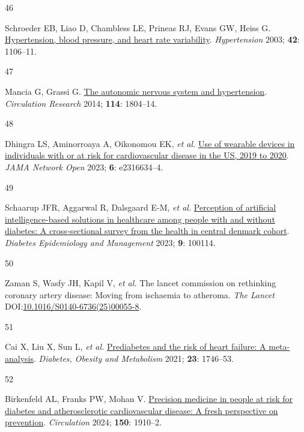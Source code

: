 \documentclass[
  a4paper,
  headsepline=true,
  open=any]{scrbook}
\newlength{\cslhangindent}
\newlength{\csllabelwidth}
\newlength{\cslentryspacingunit} %
\newenvironment{CSLReferences}[2] %
 {%
  \setlength{\parindent}{0pt}
  \ifodd #1
  \let\oldpar\par
  \def\par{\hangindent=\cslhangindent\oldpar}
  \fi
  \setlength{\parskip}{#2\cslentryspacingunit}
 }%
 {}
\newcommand{\CSLLeftMargin}[1]{\parbox[t]{\csllabelwidth}{#1}}
\newcommand{\CSLRightInline}[1]{\parbox[t]{\linewidth - \csllabelwidth}{#1}\break}
\begin{document}
\begin{CSLReferences}{0}{0}
\leavevmode{}%
\CSLLeftMargin{46 }%
\CSLRightInline{Schroeder EB, Liao D, Chambless LE, Prineas RJ, Evans
GW, Heiss G.
\href{https://doi.org/doi:10.1161/01.HYP.0000100444.71069.73}{Hypertension,
blood pressure, and heart rate variability}. \emph{Hypertension} 2003;
\textbf{42}: 1106--11.}

\leavevmode{}%
\CSLLeftMargin{47 }%
\CSLRightInline{Mancia G, Grassi G.
\href{https://doi.org/10.1161/CIRCRESAHA.114.302524}{The autonomic
nervous system and hypertension}. \emph{Circulation Research} 2014;
\textbf{114}: 1804--14.}

\leavevmode{}%
\CSLLeftMargin{48 }%
\CSLRightInline{Dhingra LS, Aminorroaya A, Oikonomou EK, \emph{et al.}
\href{https://doi.org/10.1001/jamanetworkopen.2023.16634}{Use of
wearable devices in individuals with or at risk for cardiovascular
disease in the US, 2019 to 2020}. \emph{JAMA Network Open} 2023;
\textbf{6}: e2316634--4.}

\leavevmode{}%
\CSLLeftMargin{49 }%
\CSLRightInline{Schaarup JFR, Aggarwal R, Dalsgaard E-M, \emph{et al.}
\href{https://doi.org/10.1016/j.deman.2022.100114}{Perception of
artificial intelligence-based solutions in healthcare among people with
and without diabetes: A cross-sectional survey from the health in
central denmark cohort}. \emph{Diabetes Epidemiology and Management}
2023; \textbf{9}: 100114.}

\leavevmode{}%
\CSLLeftMargin{50 }%
\CSLRightInline{Zaman S, Wasfy JH, Kapil V, \emph{et al.} The lancet
commission on rethinking coronary artery disease: Moving from ischaemia
to atheroma. \emph{The Lancet}
DOI:\href{https://doi.org/10.1016/S0140-6736(25)00055-8}{10.1016/S0140-6736(25)00055-8}.}

\leavevmode{}%
\CSLLeftMargin{51 }%
\CSLRightInline{Cai X, Liu X, Sun L, \emph{et al.}
\href{https://doi.org/10.1111/dom.14388}{Prediabetes and the risk of
heart failure: A meta-analysis}. \emph{Diabetes, Obesity and Metabolism}
2021; \textbf{23}: 1746--53.}

\leavevmode{}%
\CSLLeftMargin{52 }%
\CSLRightInline{Birkenfeld AL, Franks PW, Mohan V.
\href{https://doi.org/10.1161/CIRCULATIONAHA.124.070463}{Precision
medicine in people at risk for diabetes and atherosclerotic
cardiovascular disease: A fresh perspective on prevention}.
\emph{Circulation} 2024; \textbf{150}: 1910--2.}


\end{CSLReferences}
\end{document}
